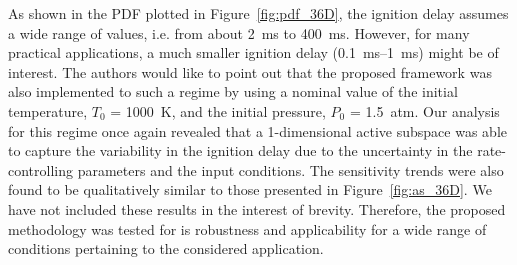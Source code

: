 As shown in the PDF plotted in Figure~\ref{fig:pdf_36D}, the ignition delay assumes a wide range of values, i.e.
from about 2~ms to 400~ms. However, for many practical applications, a much smaller ignition delay (0.1~ms--1~ms) might
be of interest. The authors would like to point out that the proposed framework was also implemented to such a regime
by using a nominal value of the initial temperature, $T_0$ = 1000~K, and the initial pressure, $P_0$ = 1.5~atm. 
Our analysis for this
regime once again revealed that a 1-dimensional active subspace was able to capture the variability in the ignition delay due to
the uncertainty in the rate-controlling parameters and the input conditions. The sensitivity trends were also found to
be qualitatively similar to those presented in Figure~\ref{fig:as_36D}. We have not included these results in the interest
of brevity. Therefore, the proposed methodology was tested
for is robustness and applicability for a wide range of conditions pertaining to the considered application. 
